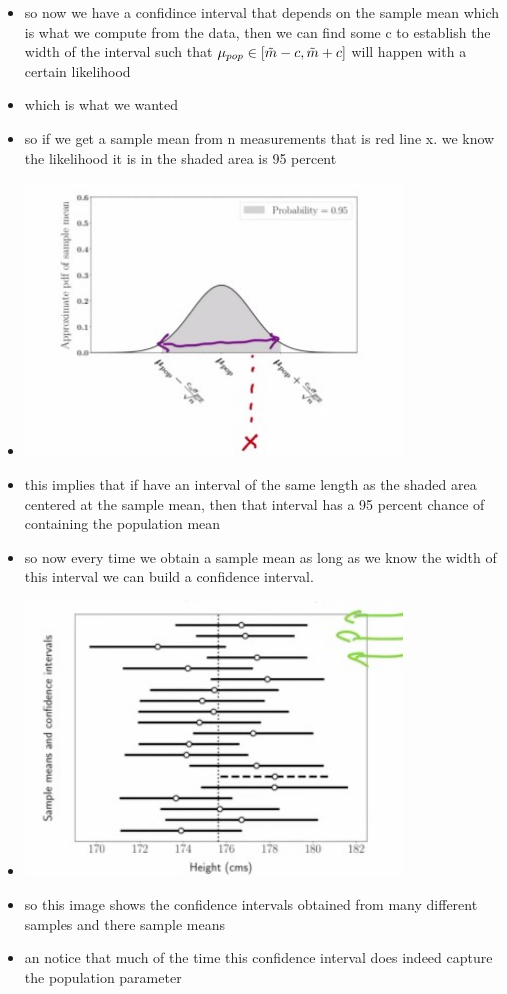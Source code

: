 \documentclass{article}
\begin{document}
\begin{itemize}
\item so now we have a confidince interval that depends on the sample mean which is what we compute from the data, then we can find some c to establish the width of the interval such that $\mu_{pop}\in [\Tilde{m}-c, \Tilde{m}+c]$ will happen with a certain likelihood
\item which is what we wanted 
\item so if we get a sample mean from n measurements that is red line x. we know the likelihood it is in the shaded area is 95 percent   
\item \includegraphics[width=10cm]{notes/week_4/vidio 4: Confidince Intervals/immages/v4_2.jpg}
\item this implies that if have an interval of the same length as the shaded area centered at the sample mean, then that interval has a 95 percent chance of containing the population mean 
\item so now every time we obtain a sample mean as long as we know the width of this interval we can build a confidence interval. 
\item \includegraphics[width=10cm]{notes/week_4/vidio 4: Confidince Intervals/immages/v4_3.jpg}
\item so this image shows the confidence intervals obtained from many different samples and there sample means 
\item an notice that much of the time this confidence interval does indeed capture the population parameter 

\end{itemize}
\end{document}
